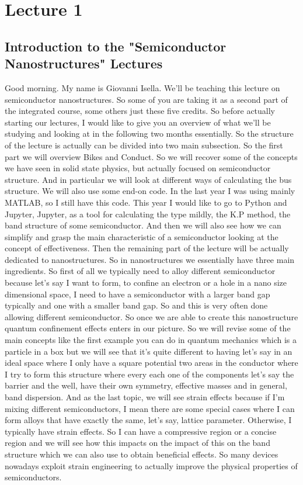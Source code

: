 \chapter{Lecture 1}
\section{Introduction to the "Semiconductor Nanostructures" Lectures}
Good morning. My name is Giovanni Isella. We'll be teaching this lecture on semiconductor nanostructures. So some of you are taking it as a second part of the integrated course, some others just these five credits. So before actually starting our lectures, I would like to give you an overview of what we'll be studying and looking at in the following two months essentially. So the structure of the lecture is actually can be divided into two main subsection. So the first part we will overview Bikes and Conduct. So we will recover some of the concepts we have seen in solid state physics, but actually focused on semiconductor structure. And in particular we will look at different ways of calculating the bus structure. We will also use some end-on code. In the last year I was using mainly MATLAB, so I still have this code. This year I would like to go to Python and Jupyter, Jupyter, as a tool for calculating the type mildly, the K.P method, the band structure of some semiconductor. And then we will also see how we can simplify and grasp the main characteristic of a semiconductor looking at the concept of effectiveness. Then the remaining part of the lecture will be actually dedicated to nanostructures. So in nanostructures we essentially have three main ingredients. So first of all we typically need to alloy different semiconductor because let's say I want to form, to confine an electron or a hole in a nano size dimensional space, I need to have a semiconductor with a larger band gap typically and one with a smaller band gap. So and this is very often done allowing different semiconductor. So once we are able to create this nanostructure quantum confinement effects enters in our picture. So we will revise some of the main concepts like the first example you can do in quantum mechanics which is a particle in a box but we will see that it's quite different to having let's say in an ideal space where I only have a square potential two areas in the conductor where I try to form this structure where every each one of the components let's say the barrier and the well, have their own symmetry, effective masses and in general, band dispersion. And as the last topic, we will see strain effects because if I'm mixing different semiconductors, I mean there are some special cases where I can form alloys that have exactly the same, let's say, lattice parameter. Otherwise, I typically have strain effects. So I can have a compressive region or a concise region and we will see how this impacts on the impact of this on the band structure which we can also use to obtain beneficial effects. So many devices nowadays exploit strain engineering to actually improve the physical properties of semiconductors.
